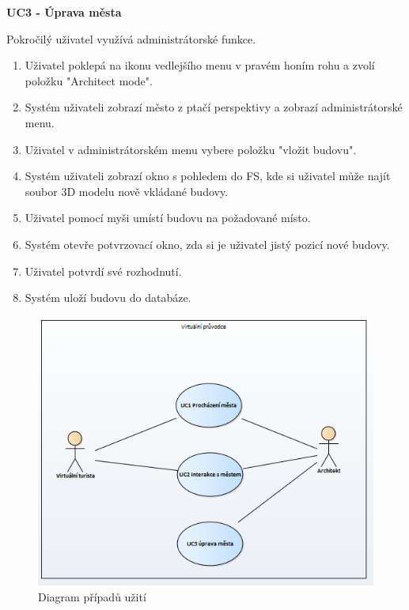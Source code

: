 \documentclass[thesis=B,czech]{FITthesis}[2012/06/26]
\begin{document}
\begin{description}
 		\item \textbf{UC3 - Úprava města}
 		
 		Pokročilý uživatel využívá administrátorské funkce.
 		\begin{enumerate}
    		\item Uživatel poklepá na ikonu vedlejšího menu v pravém honím rohu a zvolí položku "Architect mode".
    		\item Systém uživateli zobrazí město z ptačí perspektivy a zobrazí administrátorské menu.
    		\item Uživatel v administrátorském menu vybere položku "vložit budovu".
    		\item Systém uživateli zobrazí okno s pohledem do FS, kde si uživatel může najít soubor 3D modelu nově vkládané budovy.
    		\item Uživatel pomocí myši umístí budovu na požadované místo.
    		\item Systém otevře potvrzovací okno, zda si je uživatel jistý pozicí nové budovy.
    		\item Uživatel potvrdí své rozhodnutí.
    		\item Systém uloží budovu do databáze.
 		\end{enumerate}
		
 		
 	\end{description}	
 	
 	\begin{figure}
  		\includegraphics{UCdiagram.png}
  		\caption{Diagram případů užití}
  		\label{fig:UCdiagram}
	\end{figure}
	
\end{document}
